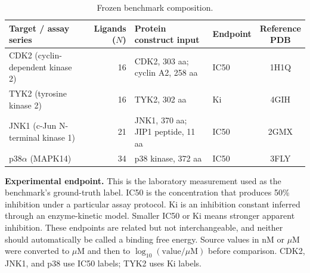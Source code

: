 \documentclass[11pt]{article}
\begin{document}
\begin{table}[H]
\centering
\small
\begin{tabular}{@{}>{\raggedright\arraybackslash}p{1.70in}r>{\raggedright\arraybackslash}p{2.25in}>{\raggedright\arraybackslash}p{0.72in}c@{}}
\toprule
Target / assay series & Ligands ($N$) & Protein construct input & Endpoint & \shortstack{Reference\\PDB} \\
\midrule
CDK2 (cyclin-dependent kinase 2) & 16 & CDK2, 303 aa; cyclin A2, 258 aa & IC50 & 1H1Q \\
TYK2 (tyrosine kinase 2) & 16 & TYK2, 302 aa & Ki & 4GIH \\
JNK1 (c-Jun N-terminal kinase 1) & 21 & JNK1, 370 aa; JIP1 peptide, 11 aa & IC50 & 2GMX \\
p38$\alpha$ (MAPK14) & 34 & p38 kinase, 372 aa & IC50 & 3FLY \\
\bottomrule
\end{tabular}
\caption{Frozen benchmark composition.}
\end{table}

\textbf{Experimental endpoint.} This is the laboratory measurement used as
the benchmark's ground-truth label. IC50 is the concentration that produces
50\% inhibition under a particular assay protocol. Ki is an inhibition
constant inferred through an enzyme-kinetic model. Smaller IC50 or Ki means
stronger apparent inhibition. These endpoints are related but not
interchangeable, and neither should automatically be called a binding free
energy. Source values in nM or $\mu$M were converted to $\mu$M and then to
$\log_{10}(\mathrm{value}/\mu\mathrm{M})$ before comparison. CDK2, JNK1, and
p38 use IC50 labels; TYK2 uses Ki labels.


\end{document}
